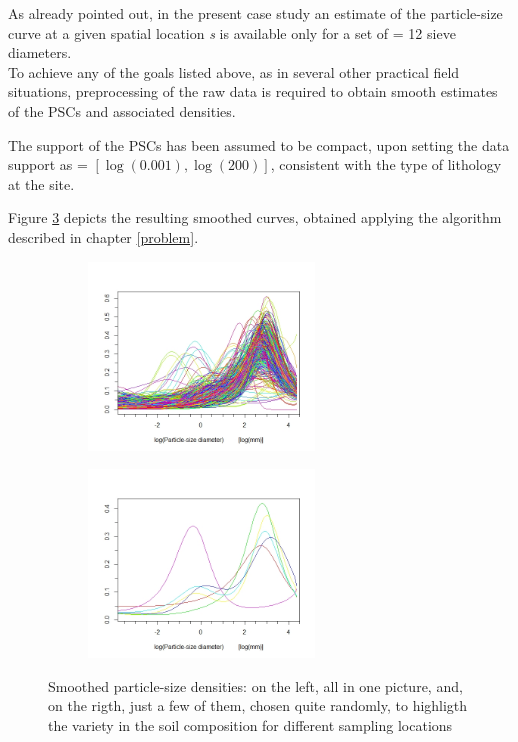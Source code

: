 As already pointed out, in the present case study an estimate of the particle-size curve at a given spatial location \textit{s} is available only for a set of  = 12 sieve diameters.  \\
To achieve any of the goals listed above, as in several other practical field situations, preprocessing of the raw data is required to obtain smooth estimates of the PSCs and associated densities.

The support of the PSCs has been assumed to be compact, upon setting the data support as  = $[\log(0.001),\log(200)]$, consistent with the type of lithology at the site.

Figure \ref{fig:psc_smoothed} depicts the resulting smoothed curves, obtained applying the algorithm described in chapter \ref{problem}.

\begin{figure}[ht]
	
	\begin{subfigure}{.5\textwidth}
		\includegraphics[width=6cm]{./pictures/psc/psc_all_res_4.jpeg} 
		\label{fig:subim1}
	\end{subfigure}
	\begin{subfigure}{.5\textwidth}
		\includegraphics[width=6cm]{./pictures/psc/psc_few_res_4.jpeg}
		\label{fig:subim2}
	\end{subfigure}
	
	\caption{Smoothed particle-size densities: on the left, all in one picture, and, on the rigth, just a few of them, chosen quite randomly, to highligth the variety in the soil composition for different sampling locations}
	\label{fig:psc_smoothed}
	
\end{figure}


